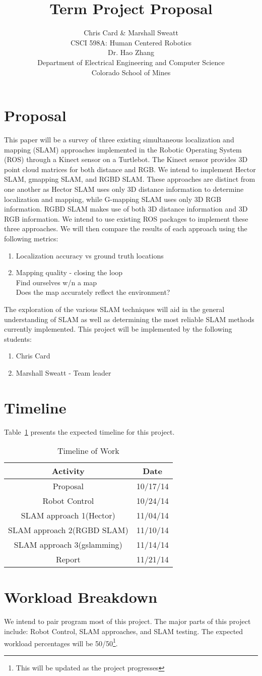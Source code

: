 \documentclass[10pt]{article}
\title{Term Project Proposal}
\author{Chris Card \& Marshall Sweatt\\
CSCI 598A: Human Centered Robotics\\
Dr. Hao Zhang\\
Department of Electrical Engineering and Computer Science\\
Colorado School of Mines}
\begin{document}
\maketitle
\newpage
\section{Proposal}
This paper will be a survey of three existing simultaneous localization and mapping (SLAM) approaches implemented in the Robotic Operating System (ROS) through a Kinect sensor on a Turtlebot.    The Kinect sensor provides 3D point cloud matrices for both distance and RGB.  We intend to implement Hector SLAM, gmapping SLAM, and RGBD SLAM.  These approaches are distinct from one another as Hector SLAM uses only 3D distance information to determine localization and mapping, while G-mapping SLAM uses only 3D RGB information.  RGBD SLAM makes use of both 3D distance information and 3D RGB information.  
We intend to use existing ROS packages to implement these three approaches.  We will then compare the results of each approach using the following metrics:
\begin{enumerate}
\item Localization accuracy vs ground truth locations
\item Mapping quality - closing the loop\\
Find ourselves w/n a map\\
Does the map accurately reflect the environment?
\end{enumerate}
The exploration of the various SLAM techniques will aid in the general understanding of SLAM as well as determining the most reliable SLAM methods currently implemented.  
This project will be implemented by the following students:
\begin{enumerate}
\item Chris Card
\item Marshall Sweatt - Team leader
\end{enumerate}

\section{Timeline}
Table~\ref{tab:timeline} presents the expected timeline for this project.
\begin{table}[h!]
\centering
\caption{Timeline of Work}
\begin{tabular}{|c|c|}
\hline
Activity & Date\\
\hline
Proposal & 10/17/14\\
Robot Control & 10/24/14\\
SLAM approach 1(Hector) & 11/04/14\\
SLAM approach 2(RGBD SLAM) & 11/10/14\\
SLAM approach 3(gslamming) & 11/14/14\\
Report & 11/21/14\\
\hline
\end{tabular}
\label{tab:timeline}
\end{table}
\section{Workload Breakdown}
We intend to pair program most of this project.  The major parts of this project include: Robot Control, SLAM approaches, and SLAM testing.  The expected workload percentages will be 50/50\footnote{This will be updated as the project progresses}.
\end{document}
